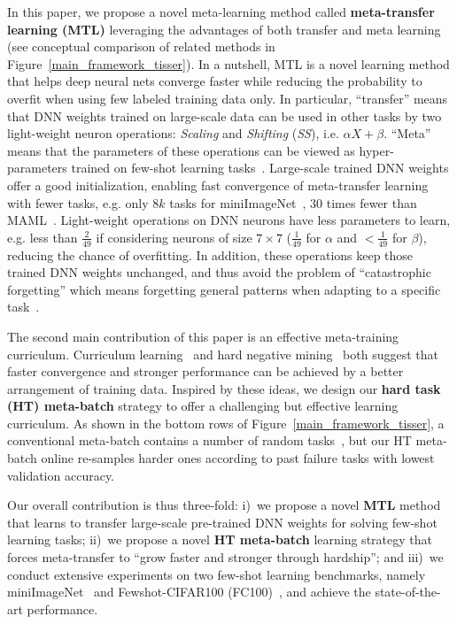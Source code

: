 In this paper, we propose a novel meta-learning method called \textbf{meta-transfer learning (MTL)} leveraging the advantages of both transfer and meta learning (see conceptual comparison of related methods in Figure~\ref{main_framework_tisser}). 
%
In a nutshell, MTL is a novel learning method that helps deep neural nets converge faster while reducing the probability to  overfit when using few labeled training data only.  
%
In particular, ``transfer'' means that DNN weights trained on large-scale data can be used in other tasks by two light-weight neuron operations: \emph{Scaling} and \emph{Shifting} (\emph{SS}), i.e. $\alpha X+\beta$. ``Meta'' means that the parameters of these operations can be viewed as hyper-parameters trained on few-shot learning tasks~\cite{MunkhdalaiICML2017, LiICML2018}.
%
%
Large-scale trained DNN weights offer a good initialization, enabling fast convergence of meta-transfer learning with fewer tasks, e.g. only $8k$ tasks for miniImageNet~\cite{VinyalsBLKW16}, $30$ times fewer than MAML~\cite{FinnAL17}.
%
Light-weight operations on DNN neurons have less parameters to learn, e.g. less than $\tfrac{2}{49}$ if considering neurons of size $7\times 7$ ($\tfrac{1}{49}$ for $\alpha$ and $<\tfrac{1}{49}$ for $\beta$), reducing the chance of overfitting.
%
In addition, these operations keep those trained DNN weights unchanged, and thus avoid the problem of ``catastrophic forgetting'' which means forgetting general patterns when adapting to a specific task~\cite{LopezPazNIPS17, McCloskey1989}.

%
%

The second main contribution of this paper is an effective meta-training curriculum.
Curriculum learning~\cite{BengioLCW09} and hard negative mining~\cite{ShrivastavaGG16} both suggest that faster convergence and stronger performance can be achieved by a better arrangement of training data.
%
%
Inspired by these ideas, we design our \textbf{hard task (HT) meta-batch} strategy to offer a challenging but effective learning curriculum.
%
As shown in the bottom rows of Figure~\ref{main_framework_tisser}, a conventional meta-batch contains a number of random tasks~\cite{FinnAL17}, but our HT meta-batch online re-samples harder ones according to past failure tasks with lowest validation accuracy.
%

Our overall contribution is thus three-fold:
i)~we propose a novel \textbf{MTL} method that learns to transfer large-scale pre-trained DNN weights for solving few-shot learning tasks; 
ii)~we propose a novel \textbf{HT meta-batch} learning strategy that forces meta-transfer to ``grow faster and stronger through hardship''; and 
iii)~we conduct extensive experiments on two few-shot learning benchmarks, namely miniImageNet~\cite{VinyalsBLKW16} and Fewshot-CIFAR100 (FC100)~\cite{OreshkinNIPS18}, and achieve the state-of-the-art performance. 
